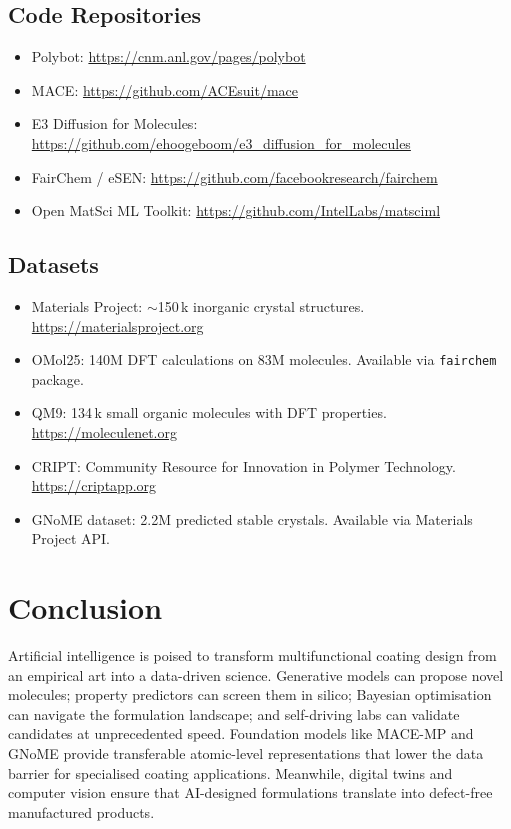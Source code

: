 \documentclass[11pt,a4paper]{article}
\begin{document}
\subsection{Code Repositories}
\begin{itemize}[nosep]
  \item Polybot: \url{https://cnm.anl.gov/pages/polybot}
  \item MACE: \url{https://github.com/ACEsuit/mace}
  \item E3 Diffusion for Molecules: \url{https://github.com/ehoogeboom/e3_diffusion_for_molecules}
  \item FairChem / eSEN: \url{https://github.com/facebookresearch/fairchem}
  \item Open MatSci ML Toolkit: \url{https://github.com/IntelLabs/matsciml}
\end{itemize}

\subsection{Datasets}
\begin{itemize}[nosep]
  \item Materials Project: $\sim$150\,k inorganic crystal structures. \url{https://materialsproject.org}
  \item OMol25: 140M DFT calculations on 83M molecules. Available via \texttt{fairchem} package.
  \item QM9: 134\,k small organic molecules with DFT properties. \url{https://moleculenet.org}
  \item CRIPT: Community Resource for Innovation in Polymer Technology. \url{https://criptapp.org}
  \item GNoME dataset: 2.2M predicted stable crystals. Available via Materials Project API.
\end{itemize}

\section{Conclusion}
\label{sec:conclusion}

Artificial intelligence is poised to transform multifunctional coating design from an empirical art into a data-driven science.
Generative models can propose novel molecules; property predictors can screen them in silico; Bayesian optimisation can navigate the formulation landscape; and self-driving labs can validate candidates at unprecedented speed.
Foundation models like MACE-MP and GNoME provide transferable atomic-level representations that lower the data barrier for specialised coating applications.
Meanwhile, digital twins and computer vision ensure that AI-designed formulations translate into defect-free manufactured products.
\end{document}

